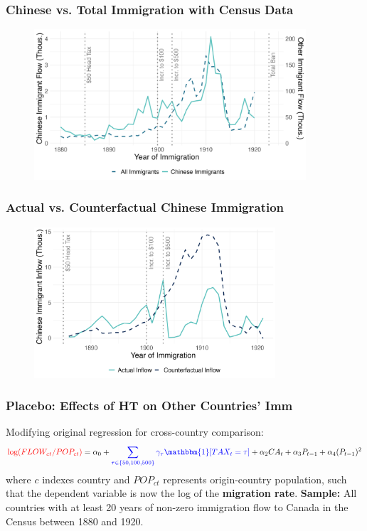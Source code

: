 \documentclass[xcolor=dvipsnames, compress, 12pt, aspectratio=169, handout]{beamer}
\begin{document}
\begin{frame}
    \label{fig1_census}
    \frametitle{Chinese vs. Total Immigration with Census Data \hyperlink{fig1_main}{}}
    \centering
    \begin{figure}
        \includegraphics[width = 0.9\textwidth]{../../figs/slides/fig2_census_flow.png}
    \end{figure}
\end{frame}

\begin{frame}
    \label{flow_cf}
    \frametitle{Actual vs. Counterfactual Chinese Immigration \hyperlink{reg_flow}{}}
    \centering
    \begin{figure}
        \includegraphics[width = 0.8\textwidth]{../../figs/slides/immflow_counterfactual.png}
    \end{figure}
\end{frame}

\begin{frame}
    \label{flow_placebo1}
    \frametitle{Placebo: Effects of HT on Other Countries' Imm \hyperlink{reg_flow}{}}
    Modifying original regression for cross-country comparison:
    \begin{equation*}
        \textcolor{red}{\log(FLOW_{ct}/POP_{ct})} = \alpha_0 + \textcolor{blue}{\sum_{\tau \in \{50, 100, 500\}} \gamma_{\tau} \mathbbm{1}[TAX_t = \tau]} + \alpha_2 CA_t + \alpha_3 P_{t-1} + \alpha_4(P_{t-1})^2
    \end{equation*}
    where $c$ indexes country and $POP_{ct}$ represents origin-country population, such that the dependent variable is now the log of the \textbf{migration rate}.
    \vspace{2mm}
    \textbf{Sample:} All countries with at least 20 years of non-zero immigration flow to Canada in the Census between 1880 and 1920.
\end{frame}
\end{document}
